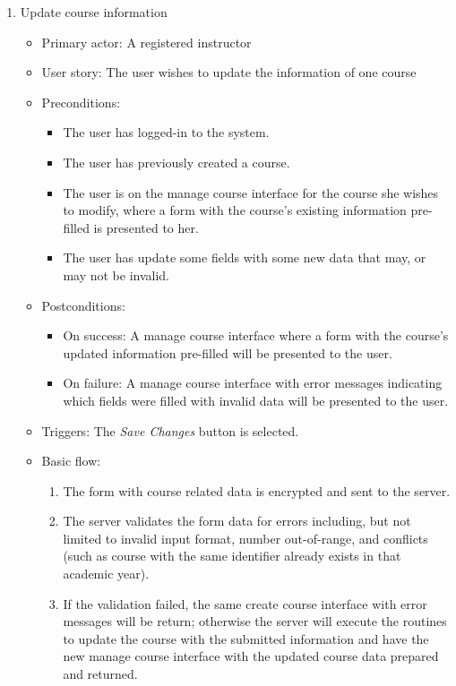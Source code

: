 \begin{enumerate}
\item Update course information
\begin{itemize}
    \item Primary actor: A registered instructor
    \item User story: The user wishes to update the information of one course
    \item Preconditions:
        \begin{itemize}
            \item The user has logged-in to the system.
            \item The user has previously created a course.
            \item The user is on the manage course interface for the course she
                wishes to modify, where a form with
                the course's existing information pre-filled is presented to
                her.
            \item The user has update some fields with some new data that may,
                or may not be invalid.
        \end{itemize}
    \item Postconditions:
        \begin{itemize}
            \item On success: A manage course interface where a form with
                the course's updated information pre-filled will be presented
                to the user.
            \item On failure: A manage course interface with error messages
                indicating which fields were filled with invalid data will be
                presented to the user.
        \end{itemize}
    \item Triggers: The \emph{Save Changes} button is selected.
    \item Basic flow:
        \begin{enumerate}
            \item The form with course related data is encrypted and sent to
                the server.
            \item The server validates the form data for errors including,
                but not limited to invalid input format, number out-of-range,
                and conflicts (such as course with the same identifier  
                already exists in that academic year).
            \item If the validation failed, the same create course interface
                with error messages will be return; otherwise the server will
                execute the routines to update the course with the submitted 
                information and have the new manage course interface with the
                updated course data prepared and returned.
        \end{enumerate}
\end{itemize}


\end{enumerate}
